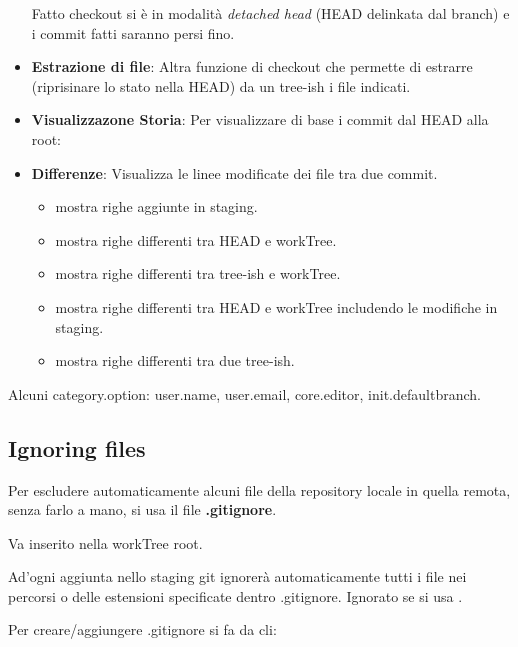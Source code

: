 \begin{itemize}

	Fatto checkout si è in modalità \textit{detached head} (HEAD delinkata dal branch) e i commit fatti saranno persi fino.

	\item \textbf{Estrazione di file}: Altra funzione di checkout che permette di estrarre (riprisinare lo stato nella HEAD) da un tree-ish i file indicati.


	\item \textbf{Visualizzazone Storia}: Per visualizzare di base i commit dal HEAD alla root:


	\item \textbf{Differenze}: Visualizza le linee modificate dei file tra due commit.
	\begin{itemize}
		\item {} mostra righe aggiunte in staging.
		\item {} mostra righe differenti tra HEAD e workTree.
		\item {} mostra righe differenti tra tree-ish e workTree.
		\item {} mostra righe differenti tra HEAD e workTree includendo le modifiche in staging.
		\item {} mostra righe differenti tra due tree-ish.
	\end{itemize}
\end{itemize}

Alcuni category.option: user.name, user.email, core.editor, init.defaultbranch.

\subsection{Ignoring files}
Per escludere automaticamente alcuni file della repository locale in quella remota, senza farlo a mano, si usa il file \textbf{.gitignore}.

Va inserito nella workTree root.

Ad'ogni aggiunta nello staging git ignorerà automaticamente tutti i file nei percorsi o delle estensioni specificate dentro .gitignore. Ignorato se si usa .

Per creare/aggiungere .gitignore si fa da cli:

